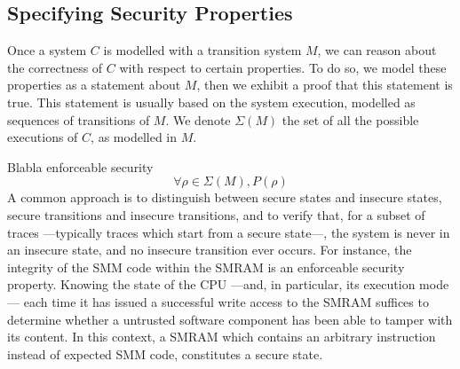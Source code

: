 %
%
%
%
%
%

\subsection{Specifying Security Properties}
\label{subsec:state:secu}

Once a system $C$ is modelled with a transition system $M$, we can reason about
the correctness of $C$ with respect to certain properties.
%
To do so, we model these properties as a statement about $M$, then we exhibit a
proof that this statement is true.
%
This statement is usually based on the system execution, modelled as sequences
of transitions of $M$.
%
We denote $\Sigma(M)$ the set of all the possible executions of $C$, as modelled
in $M$.

Blabla enforceable security
%
\[
  \forall \rho \in \Sigma(M), P(\rho)
\]
%
A common approach is to distinguish between secure states and insecure states,
secure transitions and insecure transitions, and to verify that, for a subset of
traces ---typically traces which start from a secure state---, the system is
never in an insecure state, and no insecure transition ever occurs.
%
For instance, the integrity of the SMM code within the SMRAM is an enforceable
security property.
%
Knowing the state of the CPU ---and, in particular, its execution mode--- each
time it has issued a successful write access to the SMRAM suffices to determine
whether a untrusted software component has been able to tamper with its content.
%
In this context, a SMRAM which contains an arbitrary instruction instead of
expected SMM code, constitutes a secure state.

